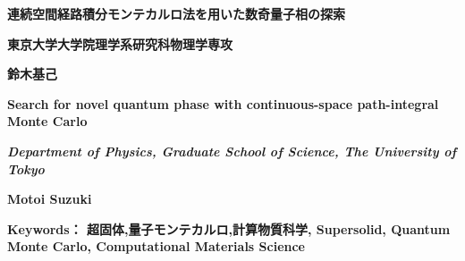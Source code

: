 \documentclass[a4j,12pt]{jarticle}
\begin{document}
\sloppy

\begin{center}
{\fontsize{16pt}{14pt} \gtfamily \bf 
連続空間経路積分モンテカルロ法を用いた数奇量子相の探索
}
\end{center}

\begin{center}
{\fontsize{14pt}{14pt} \bf 
東京大学大学院理学系研究科物理学専攻

\bf 鈴木基己}

{\fontsize{14pt}{14pt} \selectfont \bf 
Search for novel quantum phase with continuous-space path-integral Monte Carlo

\itshape \bfseries 
Department of Physics, Graduate School of Science, The University of Tokyo
 
\bf
Motoi Suzuki
 }
\end{center}





{\fontsize{14pt}{4pt} \bf Keywords：
超固体,量子モンテカルロ,計算物質科学, Supersolid, Quantum Monte Carlo, Computational Materials Science
}


\vspace*{5mm}

\end{document}

